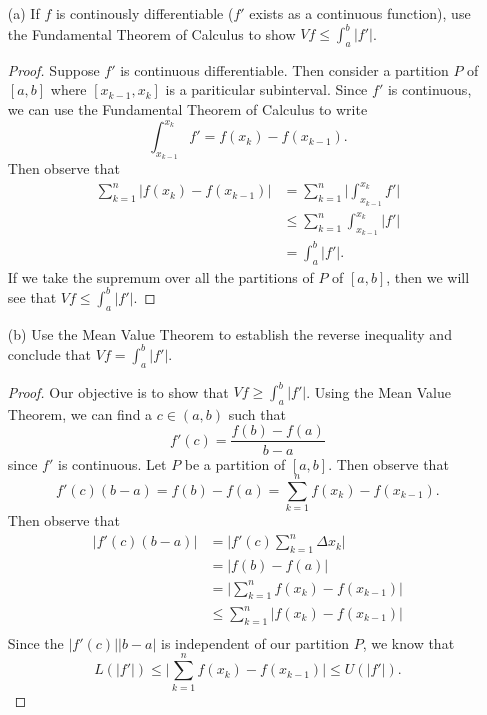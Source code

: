 \begin{enumerate}
    \item[(a)] If \( f  \) is continously differentiable (\( f' \) exists as a continuous function), use the Fundamental Theorem of Calculus to show \( Vf \leq \int_{ a }^{ b } | f' |  \).
		\begin{proof}
			Suppose \( f' \) is continuous differentiable. Then consider a partition \( P  \) of \( [a,b]  \) where \( [x_{k-1}, x_{k }] \) is a pariticular subinterval. Since \( f'  \) is continuous, we can use the Fundamental Theorem of Calculus to write 
			\[  \int_{ x_{k-1} }^{ x_{k } }  f'   = f(x_{k}) - f(x_{k-1}). \]
			Then observe that 
			\begin{align*}
				\sum_{ k=1 }^{ n } | f(x_{k}) - f(x_{k -1})  | &= \sum_{ k=1 }^{ n } \Bigg|  \int_{ x_{k-1} }^{ x_{k }  }  f' \Bigg|     \\
															   &\leq \sum_{ k=1 }^{ n }\int_{ x_{k-1} }^{x_{k } } | f' |   \\
															   &= \int_{ a }^{ b } | f' |.
			\end{align*}
			If we take the supremum over all the partitions of \( P  \) of \( [a,b]  \), then we will see that \( Vf \leq \int_{ a }^{ b } | f' |. \)
		\end{proof}
	\item[(b)] Use the Mean Value Theorem to establish the reverse inequality and conclude that \( Vf = \int_{ a }^{ b } | f' |. \)
		\begin{proof}
		Our objective is to show that \( Vf \geq \int_{ a }^{ b } | f' | \). Using the Mean Value Theorem, we can find a \( c \in (a,b)  \) such that
		\[  f'(c) = \frac{ f(b) - f(a) }{ b -a  }   \]
		since \( f'  \) is continuous. Let \( P  \) be a partition of \( [a,b]  \). Then observe that  
		\[  f'(c) (b-a ) = f(b) - f(a) = \sum_{ k=1 }^{ n } f(x_{ k }) - f(x_{k-1}) . \]
		Then observe that 
		\begin{align*}
		    | f'(c) (b-a) |  &= \Big| f'(c) \sum_{ k=1 }^{ n } \Delta x_{k } \Big|  \\
							 &= | f(b) - f(a) |  \\
							 &= \Big| \sum_{ k=1 }^{ n } f(x_{k}) - f(x_{k-1})  \Big| \\
							 &\leq \sum_{ k=1 }^{ n } | f(x_{k}) - f(x_{k-1}) | \\ 
		\end{align*}
		Since the \( | f'(c)  | | b -a  |  \) is independent of our partition \( P  \), we know that 
		\[  L(| f' | ) \leq \Big| \sum_{ k=1 }^{ n } f(x_{k}) - f(x_{k-1}) \Big| \leq U(|f' | ). \]

\end{proof}
\end{enumerate}
